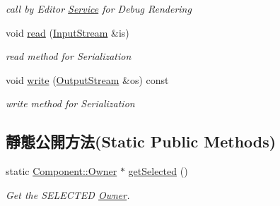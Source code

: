 \begin{DoxyCompactItemize}
\begin{DoxyCompactList}\small\item\em call by Editor \hyperlink{class_magnum_1_1_service}{Service} for Debug Rendering \end{DoxyCompactList}\item 
void \hyperlink{class_magnum_1_1_component_1_1_owner_ad3a6cf325d63ebe6e67440f7c8688420}{read} (\hyperlink{class_magnum_1_1_input_stream}{Input\+Stream} \&is)
\begin{DoxyCompactList}\small\item\em read method for Serialization \end{DoxyCompactList}\item 
void \hyperlink{class_magnum_1_1_component_1_1_owner_aa0aa90562a79de82adecd5b0451d3bd5}{write} (\hyperlink{class_magnum_1_1_output_stream}{Output\+Stream} \&os) const 
\begin{DoxyCompactList}\small\item\em write method for Serialization \end{DoxyCompactList}\end{DoxyCompactItemize}
\subsection*{靜態公開方法(Static Public Methods)}
\begin{DoxyCompactItemize}
\item 
static \hyperlink{class_magnum_1_1_component_1_1_owner}{Component\+::\+Owner} $\ast$ \hyperlink{class_magnum_1_1_component_1_1_owner_a0235cf8f0a39af071d264c93fe83f959}{get\+Selected} ()\hypertarget{class_magnum_1_1_component_1_1_owner_a0235cf8f0a39af071d264c93fe83f959}{}\label{class_magnum_1_1_component_1_1_owner_a0235cf8f0a39af071d264c93fe83f959}

\begin{DoxyCompactList}\small\item\em Get the S\+E\+L\+E\+C\+T\+ED \hyperlink{class_magnum_1_1_component_1_1_owner}{Owner}. \end{DoxyCompactList}\end{DoxyCompactItemize}
